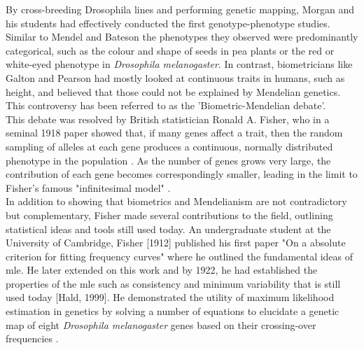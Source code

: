 By cross-breeding Drosophila lines and performing genetic mapping, Morgan and his students had effectively conducted the first genotype-phenotype studies. 
Similar to Mendel and Bateson the phenotypes they observed were predominantly categorical, such as the colour and shape of seeds in pea plants or the red or white-eyed phenotype in \textit{Drosophila melanogaster}. 
In contrast, biometricians like Galton and Pearson had mostly looked at continuous traits in humans, such as height, and believed that those could not be explained by Mendelian genetics.
This controversy has been referred to as the 'Biometric-Mendelian debate'.\\ 

This debate was resolved by British statistician Ronald A. Fisher, who in a seminal 1918 paper showed that, if many genes affect a trait, then the random sampling of alleles at each gene produces a continuous, normally distributed phenotype in the population \cite{fisher1919xv}. 
As the number of genes grows very large, the contribution of each gene becomes correspondingly smaller, leading in the limit to Fisher’s famous "infinitesimal model" \cite{barton2017infinitesimal}.\\

In addition to showing that biometrics and Mendelianism are not contradictory but complementary, Fisher made several contributions to the field, outlining statistical ideas and tools still used today. 
An undergraduate student at the University of Cambridge, Fisher [1912] published his first paper "On a absolute criterion for fitting frequency curves" where he outlined the fundamental ideas of \gls{mle}. 
He later extended on this work and by 1922, he had established the properties of the \gls{mle} such as consistency and minimum variability \cite{fisher1922mathematical} that is still used today [Hald, 1999]. 
He demonstrated the utility of maximum likelihood estimation in genetics by solving a number of equations to elucidate a genetic map of eight \textit{Drosophila melanogaster} genes based on their crossing-over frequencies \cite{fisher1922systematic}.\\ 



